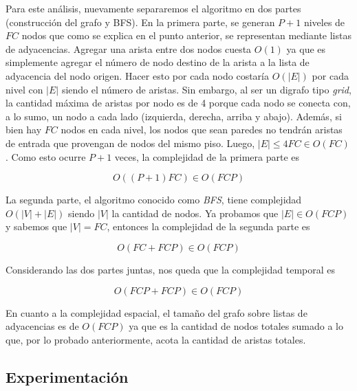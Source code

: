       Para este análisis, nuevamente separaremos el algoritmo en dos partes (construcción del grafo y BFS). En la primera parte, se generan $P+1$ niveles de $FC$ nodos que como se explica en el punto anterior, se representan mediante listas de adyacencias. Agregar una arista entre dos nodos cuesta $O(1)$ ya que es simplemente agregar el número de nodo destino de la arista a la lista de adyacencia del nodo origen. Hacer esto por cada nodo costaría $O(|E|)$ por cada nivel con $|E|$ siendo el número de aristas. Sin embargo, al ser un digrafo tipo \textit{grid}, la cantidad máxima de aristas por nodo es de 4 porque cada nodo se conecta con, a lo sumo, un nodo a cada lado (izquierda, derecha, arriba y abajo). Además, si bien hay $FC$ nodos en cada nivel, los nodos que sean paredes no tendrán aristas de entrada que provengan de nodos del mismo piso. Luego, $|E| \leq 4FC \in O(FC)$. Como esto ocurre $P+1$ veces, la complejidad de la primera parte es

      \[
        O((P+1)FC) \in O(FCP)
      \]


      La segunda parte, el algoritmo conocido como \textit{BFS}, tiene complejidad $O(|V| + |E|)$ siendo $|V|$ la cantidad de nodos. Ya probamos que $|E| \in O(FCP)$ y sabemos que $|V| = FC$, entonces la complejidad de la segunda parte es

      \[
        O(FC + FCP) \in O(FCP)
      \]

      Considerando las dos partes juntas, nos queda que la complejidad temporal es

      \[
        O(FCP + FCP) \in O(FCP)
      \]

      En cuanto a la complejidad espacial, el tamaño del grafo sobre listas de adyacencias es de $O(FCP)$ ya que es la cantidad de nodos totales sumado a lo que, por lo probado anteriormente, acota la cantidad de aristas totales.



    \subsection{Experimentación}

